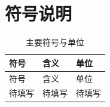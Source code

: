 \section{符号说明}
\begingroup\small
\setlength{\tabcolsep}{4pt}\renewcommand{\arraystretch}{1.06}
\begin{longtable}{p{}p{}p{}}
\caption{主要符号与单位}\\\toprule
符号 & 含义 & 单位\\\midrule
\endfirsthead
\toprule 符号 & 含义 & 单位\\\midrule
\endhead
\bottomrule\endfoot
待填写 & 待填写 & 待填写\\
\end{longtable}
\endgroup
